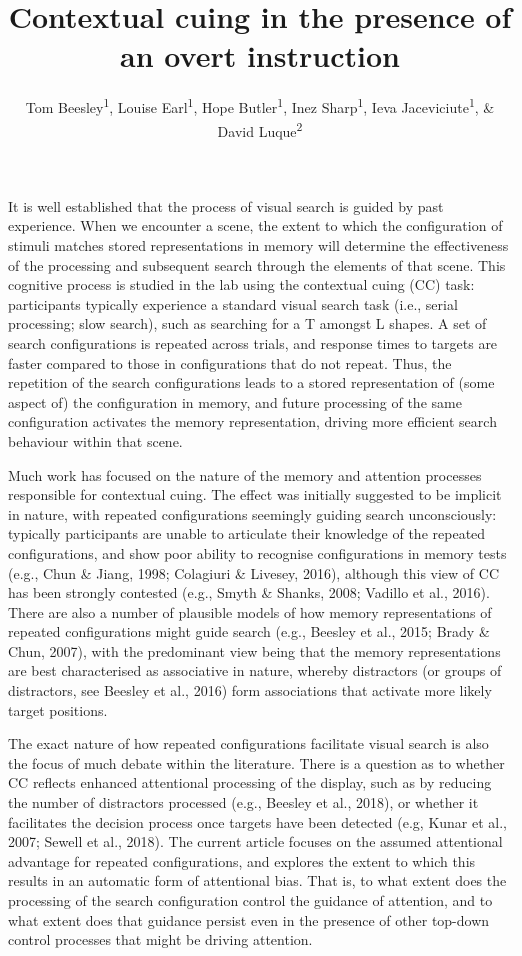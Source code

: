 \documentclass[
  man,floatsintext]{apa7}
\title{Contextual cuing in the presence of an overt instruction}
\author{Tom Beesley\textsuperscript{1}, Louise Earl\textsuperscript{1}, Hope Butler\textsuperscript{1}, Inez Sharp\textsuperscript{1}, Ieva Jaceviciute\textsuperscript{1}, \& David Luque\textsuperscript{2}}
\date{}
\affiliation{\vspace{0.5cm}\textsuperscript{1} Lancaster University, UK\\\textsuperscript{2} Universidad de Málaga, Spain}
\begin{document}
\maketitle

It is well established that the process of visual search is guided by past experience. When we encounter a scene, the extent to which the configuration of stimuli matches stored representations in memory will determine the effectiveness of the processing and subsequent search through the elements of that scene. This cognitive process is studied in the lab using the contextual cuing (CC) task: participants typically experience a standard visual search task (i.e., serial processing; slow search), such as searching for a T amongst L shapes. A set of search configurations is repeated across trials, and response times to targets are faster compared to those in configurations that do not repeat. Thus, the repetition of the search configurations leads to a stored representation of (some aspect of) the configuration in memory, and future processing of the same configuration activates the memory representation, driving more efficient search behaviour within that scene.

Much work has focused on the nature of the memory and attention processes responsible for contextual cuing. The effect was initially suggested to be implicit in nature, with repeated configurations seemingly guiding search unconsciously: typically participants are unable to articulate their knowledge of the repeated configurations, and show poor ability to recognise configurations in memory tests (e.g., Chun \& Jiang, 1998; Colagiuri \& Livesey, 2016), although this view of CC has been strongly contested (e.g., Smyth \& Shanks, 2008; Vadillo et al., 2016). There are also a number of plausible models of how memory representations of repeated configurations might guide search (e.g., Beesley et al., 2015; Brady \& Chun, 2007), with the predominant view being that the memory representations are best characterised as associative in nature, whereby distractors (or groups of distractors, see Beesley et al., 2016) form associations that activate more likely target positions.

The exact nature of how repeated configurations facilitate visual search is also the focus of much debate within the literature. There is a question as to whether CC reflects enhanced attentional processing of the display, such as by reducing the number of distractors processed (e.g., Beesley et al., 2018), or whether it facilitates the decision process once targets have been detected (e.g, Kunar et al., 2007; Sewell et al., 2018). The current article focuses on the assumed attentional advantage for repeated configurations, and explores the extent to which this results in an automatic form of attentional bias. That is, to what extent does the processing of the search configuration control the guidance of attention, and to what extent does that guidance persist even in the presence of other top-down control processes that might be driving attention.
\end{document}
